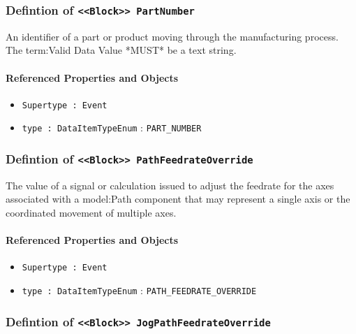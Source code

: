 \subsubsection{Defintion of \texttt{<<Block>> PartNumber}}
  \label{type:PartNumber}

\FloatBarrier

An identifier of a part or product moving through the manufacturing process. 
 The {term:Valid Data Value} *MUST* be a text string. 

\FloatBarrier
\paragraph{Referenced Properties and Objects}

\begin{itemize}
\item \texttt{Supertype : Event}

\item \texttt{type : DataItemTypeEnum} : \texttt{PART_NUMBER}

\end{itemize}
\FloatBarrier
\subsubsection{Defintion of \texttt{<<Block>> PathFeedrateOverride}}
  \label{type:PathFeedrateOverride}

\FloatBarrier

The value of a signal or calculation issued to adjust the feedrate for the axes associated with a {model:Path} component that may represent a single axis or the coordinated movement of multiple axes.

\FloatBarrier
\paragraph{Referenced Properties and Objects}

\begin{itemize}
\item \texttt{Supertype : Event}

\item \texttt{type : DataItemTypeEnum} : \texttt{PATH_FEEDRATE_OVERRIDE}

\end{itemize}
\FloatBarrier
\subsubsection{Defintion of \texttt{<<Block>> JogPathFeedrateOverride}}
  \label{type:JogPathFeedrateOverride}

